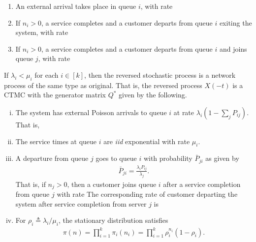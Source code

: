 \documentclass[a4paper,10pt,english]{article}
\begin{document}
\begin{enumerate}[i\_]
\item An external arrival takes place in queue $i$, with rate 
\item If $n_i > 0$, a service completes and a customer departs from queue $i$ exiting the system, with rate 
\item If $n_i > 0$, a service completes and a customer departs from queue $i$ and joins queue $j$, with rate 
\end{enumerate}

\begin{thm}
If $\lambda_i < \mu_i$ for each $i \in [k]$, then the reversed stochastic process is a network process of the same type as original. 
That is, the reversed process $X(-t)$ is a CTMC with the generator matrix $Q^{\ast}$ given by the following.  
\begin{enumerate}[(i)]
\item The system has external Poisson arrivals to queue $i$ at rate $\lambda_i(1-\sum_jP_{ij})$. 
That is, 
\item The service times at queue $i$ are \textit{iid} exponential with rate $\mu_i$. 
\item  A departure from queue $j$ goes to queue $i$ with probability $\bar{P}_{ji}$ as given by
\begin{align*}
\bar{P}_{ji}=\frac{\lambda_i P_{ij}}{\lambda_j}.
\end{align*}
That is, if $n_j > 0$, then a customer joins queue $i$ after a service completion from queue $j$ with rate 
The corresponding rate of customer departing the system after service completion from server $j$ is
\item For $\rho_i \triangleq \lambda_i/\mu_i$, the stationary distribution satisfies
\begin{align*}
\pi(n)= \prod_{i=1}^k\pi_i(n_i) = \prod_{i=1}^k\rho_i^{n_i}(1-\rho_i).
\end{align*}
\end{enumerate}
\end{thm}
\end{document}
